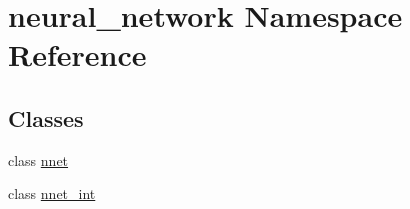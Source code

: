 \hypertarget{namespaceneural__network}{}\section{neural\+\_\+network Namespace Reference}
\label{namespaceneural__network}
\subsection*{Classes}
\begin{DoxyCompactItemize}
\item 
class \hyperlink{classneural__network_1_1nnet}{nnet}
\item 
class \hyperlink{classneural__network_1_1nnet__int}{nnet\+\_\+int}
\end{DoxyCompactItemize}
